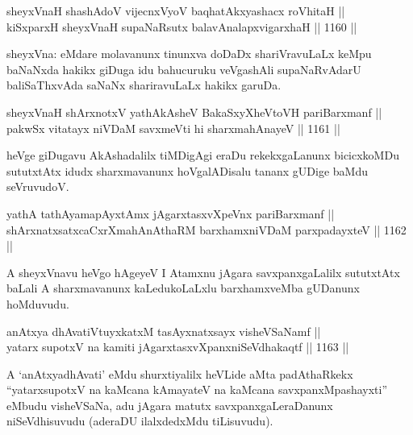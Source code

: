 
\begin{shl}
sheyxVnaH shashAdoV vijecnxVyoV baqhatAkxyashacx roVhitaH || \\
kiSxparxH sheyxVnaH supaNaRsutx balavAnalapxvigarxhaH ||  1160 ||  
\end{shl}

\begin{artha}
sheyxVna: eMdare molavanunx tinunxva doDaDx shariVravuLaLx keMpu baNaNxda hakikx giDuga idu bahucuruku veVgashAli supaNaRvAdarU baliSaThxvAda saNaNx shariravuLaLx hakikx garuDa.
\end{artha}

\begin{shl}
sheyxVnaH shArxnotxV yathA\s \s kAsheV BakaSxyXheVtoVH pariBarxmanf || \\
pakwSx vitatayx niVDaM savxmeVti hi sharxmahAnayeV ||  1161 || 
\end{shl}

\begin{artha}
heVge giDugavu AkAshadalilx tiMDigAgi eraDu rekekxgaLanunx bicicxkoMDu sututxtAtx idudx sharxmavanunx hoVgalADisalu tananx gUDige baMdu seVruvudoV.
\end{artha}

\begin{shl}
yathA tathA\s yamapAyxtAmx jAgarxtasxvXpeVnx pariBarxmanf || \\
shArxnatxsatxcaCxrXmahAnAthaRM barxhamxniVDaM parxpadayxteV ||  1162 ||  
\end{shl}

\begin{artha}
A sheyxVnavu heVgo hAgeyeV I Atamxnu jAgara savxpanxgaLalilx sututxtAtx baLali A sharxmavanunx kaLedukoLaLxlu barxhamxveMba gUDanunx hoMduvudu.
\end{artha}


\begin{shl}
anAtxya dhAvatiVtuyxkatxM tasAyxnatxsayx visheVSaNamf || \\
yatarx supotxV na kamiti jAgarxtasxvXpanxniSeVdhakaqtf ||  1163 ||  
\end{shl}

\begin{artha}
A `anAtxyadhAvati' eMdu shurxtiyalilx heVLide aMta padAthaRkekx ``yatarxsupotxV na kaMcana kAmayateV na kaMcana savxpanxMpashayxti'' eMbudu visheVSaNa, adu jAgara matutx savxpanxgaLeraDanunx niSeVdhisuvudu (aderaDU ilalxdedxMdu tiLisuvudu).
\end{artha}

